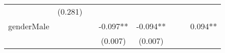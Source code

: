 \documentclass[]{article}
\begin{document}
\begin{longtable}[]{@{}lccccccc@{}}
\begin{minipage}[t]{0.10\columnwidth}
\strut
\end{minipage} & \begin{minipage}[t]{0.10\columnwidth}\centering\strut
(0.281)\strut
\end{minipage}\tabularnewline
\begin{minipage}[t]{0.12\columnwidth}\raggedright\strut
genderMale\strut
\end{minipage} & \begin{minipage}[t]{0.09\columnwidth}\centering\strut
\strut
\end{minipage} & \begin{minipage}[t]{0.10\columnwidth}\centering\strut
\strut
\end{minipage} & \begin{minipage}[t]{0.10\columnwidth}\centering\strut
-0.097**\strut
\end{minipage} & \begin{minipage}[t]{0.10\columnwidth}\centering\strut
-0.094**\strut
\end{minipage} & \begin{minipage}[t]{0.10\columnwidth}\centering\strut
\strut
\end{minipage} & \begin{minipage}[t]{0.10\columnwidth}\centering\strut
\strut
\end{minipage} & \begin{minipage}[t]{0.10\columnwidth}\centering\strut
0.094**\strut
\end{minipage}\tabularnewline
\begin{minipage}[t]{0.12\columnwidth}\raggedright\strut
\strut
\end{minipage} & \begin{minipage}[t]{0.09\columnwidth}\centering\strut
\strut
\end{minipage} & \begin{minipage}[t]{0.10\columnwidth}\centering\strut
\strut
\end{minipage} & \begin{minipage}[t]{0.10\columnwidth}\centering\strut
(0.007)\strut
\end{minipage} & \begin{minipage}[t]{0.10\columnwidth}\centering\strut
(0.007)\strut
\end{minipage} & \begin{minipage}[t]{0.10\columnwidth}\centering\strut
\strut
\end{minipage} & \begin{minipage}[t]{0.10\columnwidth}\centering\strut

\end{minipage}
\end{longtable}
\end{document}
